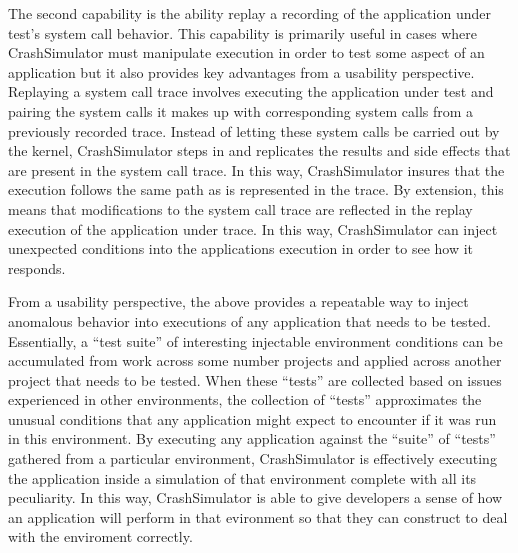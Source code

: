 The second capability is the ability replay a recording of the application under test's system call behavior.  This
capability is primarily useful in cases where CrashSimulator must manipulate execution in order to test some aspect of
an application but it also provides key advantages from a usability perspective.  Replaying a system call trace involves
executing the application under test and pairing the system calls it makes up with corresponding system calls from a
previously recorded trace.  Instead of letting these system calls be carried out by the kernel, CrashSimulator steps in
and replicates the results and side effects that are present in the system call trace.  In this way, CrashSimulator
insures that the execution follows the same path as is represented in the trace.  By extension, this means that
modifications to the system call trace are reflected in the replay execution of the application under trace.  In this
way, CrashSimulator can inject unexpected conditions into the applications execution in order to see how it responds.


From a usability perspective, the above provides a repeatable way to inject anomalous behavior into executions of any
application that needs to be tested.  Essentially, a ``test suite'' of interesting injectable environment conditions can
be accumulated from work across some number projects and applied across another project that needs to be tested.  When
these ``tests'' are collected based on issues experienced in other environments, the collection of ``tests''
approximates the unusual conditions that any application might expect to encounter if it was run in this environment.
By executing any application against the ``suite'' of ``tests'' gathered from a particular environment, CrashSimulator
is effectively executing the application inside a simulation of that environment complete with all its peculiarity.  In
this way, CrashSimulator is able to give developers a sense of how an application will perform in that evironment so
that they can construct to deal with the enviroment correctly.


